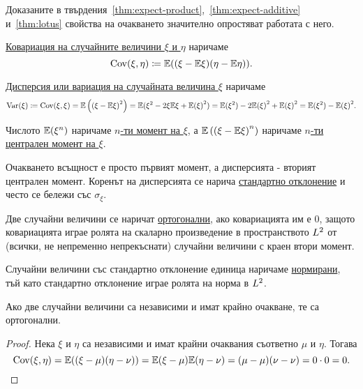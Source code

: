 \documentclass[numbers=endperiod, DIV=15, bibliography=totocnumbered]{scrartcl}
\begin{document}
Доказаните в твърдения~\ref{thm:expect-product},~\ref{thm:expect-additive} и~\ref{thm:lotus} свойства на очакването значително опростяват работата с него.

\begin{definition}
  \uline{Ковариация на случайните величини $\xi$ и $\eta$} наричаме
  \begin{displaymath}
    \operatorname{Cov}(\xi, \eta)
    \coloneqq
    \mathbb{E}((\xi - \mathbb{E} \xi) (\eta - \mathbb{E} \eta)).
  \end{displaymath}

  \uline{Дисперсия или вариация на случайната величина $\xi$} наричаме
  \begin{displaymath}
    \operatorname{Var}(\xi)
    \coloneqq
    \operatorname{Cov}(\xi, \xi)
    =
    \mathbb{E} \left({(\xi - \mathbb{E} \xi)}^2 \right)
    =
    \mathbb{E}(\xi^2 - 2 \xi \mathbb{E} \xi + {\mathbb{E}(\xi)}^2)
    =
    \mathbb{E}(\xi^2) - 2 {\mathbb{E}(\xi)}^2 + {\mathbb{E}(\xi)}^2
    =
    \mathbb{E}(\xi^2) - {\mathbb{E}(\xi)}^2.
  \end{displaymath}

  Числото $\mathbb{E}(\xi^n)$ наричаме \uline{$n$-ти момент на $\xi$}, а $\mathbb{E} \left( {(\xi - \mathbb{E} \xi)}^n \right)$ наричаме \uline{$n$-ти централен момент на $\xi$}.

  Очакването всъщност е просто първият момент, а дисперсията - вторият централен момент. Коренът на дисперсията се нарича \uline{стандартно отклонение} и често се бележи със $\sigma_\xi$.

  Две случайни величини се наричат \uline{ортогонални}, ако ковариацията им е $0$, защото ковариацията играе ролята на скаларно произведение в пространството $L^2$ от (всички, не непременно непрекъснати) случайни величини с краен втори момент.

  Случайни величини със стандартно отклонение единица наричаме \uline{нормирани}, тъй като стандартно отклонение играе ролята на норма в $L^2$.
\end{definition}

\begin{proposition}\label{thm:orthogonal-if-independent}
  Ако две случайни величини са независими и имат крайно очакване, те са ортогонални.
\end{proposition}
\begin{proof}
  Нека $\xi$ и $\eta$ са независими и имат крайни очаквания съответно $\mu$ и $\eta$. Тогава
  \begin{displaymath}
    \operatorname{Cov}(\xi, \eta)
    =
    \mathbb{E}((\xi - \mu) (\eta - \nu))
    =
    \mathbb{E}(\xi - \mu) \mathbb{E}(\eta - \nu)
    =
    (\mu - \mu) (\nu - \nu)
    =
    0 \cdot 0
    =
    0.
  \end{displaymath}
\end{proof}
\end{document}
